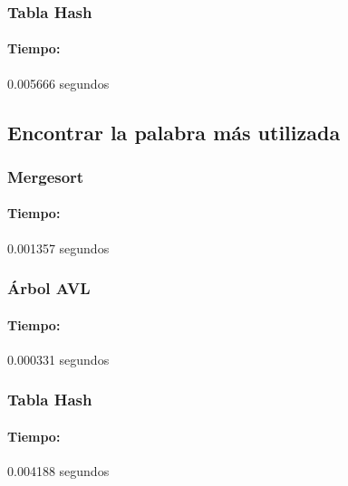 \documentclass[12pt,letterpaper]{scrartcl}
\begin{document}
\subsubsection{Tabla Hash}

\paragraph{Tiempo:} 0.005666 segundos


\subsection{Encontrar la palabra más utilizada}

\subsubsection{Mergesort}

\paragraph{Tiempo:} 0.001357 segundos


\subsubsection{Árbol AVL}

\paragraph{Tiempo:} 0.000331 segundos

\subsubsection{Tabla Hash}

\paragraph{Tiempo:} 0.004188 segundos
\end{document}
